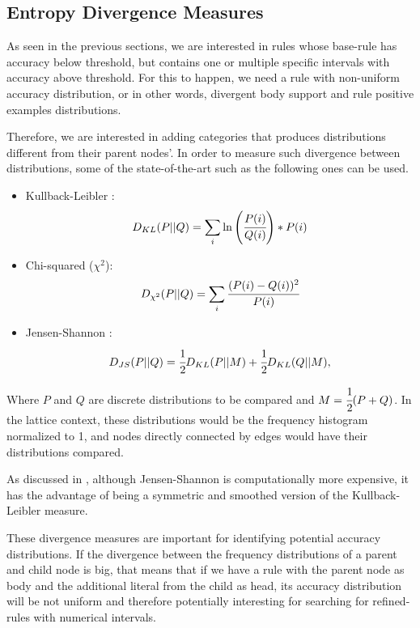 \subsection{Entropy Divergence Measures}

As seen in the previous sections, we are interested in rules whose base-rule has accuracy below threshold, but contains
one or multiple specific intervals with accuracy above threshold. For this to happen, we need a rule with non-uniform
accuracy distribution, or in other words, divergent body support and rule positive examples distributions.

Therefore, we are interested in adding categories that produces distributions different from their parent nodes'. In
order to measure such divergence between distributions, some of the state-of-the-art such as the following ones can be
used.

\begin{itemize}
 \item Kullback-Leibler \cite{Kullback51klDivergence}: 
    \begin{equation}
      D_{KL}(P||Q)=\sum_{\substack{i}}\ln\left(\cfrac{P(i)}{Q(i)}\right)*P(i)
    \end{equation}
 \item Chi-squared ($\chi^2$):
    \begin{equation}
      D_{\chi^2}(P||Q)=\sum_{\substack{i}}\cfrac{(P(i)-Q(i))^2}{P(i)}
    \end{equation}
 \item Jensen-Shannon \cite{17795}:
    \begin{equation}
      D_{JS}(P||Q)=\cfrac{1}{2}D_{KL}(P||M)+\cfrac{1}{2}D_{KL}(Q||M), 
    \end{equation}
\end{itemize}

Where $P$ and $Q$ are discrete distributions to be compared and $M=\cfrac{1}{2}(P+Q)$. In the lattice context, these
distributions would be the frequency histogram normalized to 1, and nodes directly connected by edges would have their
distributions compared.

As discussed in \cite{17795}, although Jensen-Shannon is computationally more expensive, it has the advantage of being a
symmetric and smoothed version of the Kullback-Leibler measure.

These divergence measures are important for identifying potential accuracy distributions. If the divergence between the
frequency distributions of a parent and child node is big, that means that if we have a rule with the parent node as
body and the additional literal from the child as head, its accuracy distribution will be not uniform and therefore
potentially interesting for searching for refined-rules with numerical intervals.


